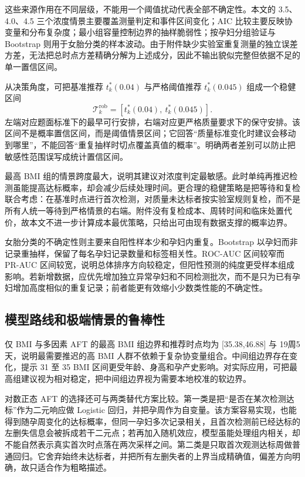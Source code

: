 \documentclass[UTF8,a4paper,12pt]{ctexart}
\begin{document}
这些来源作用在不同层级，不能用一个阈值扰动代表全部不确定性。本文的 3.5、4.0、4.5 三个浓度情景主要覆盖测量判定和事件区间变化；AIC 比较主要反映协变量和分布复杂度；最小组容量控制边界的抽样脆弱性；按孕妇分组验证与 Bootstrap 则用于女胎分类的样本波动。由于附件缺少实验室重复测量的独立误差方差，无法把总时点方差精确分解为上述成分，因此不输出貌似完整但依据不足的单一置信区间。

从决策角度，可把基准推荐 $t_k^*(0.04)$ 与严格阈值推荐 $t_k^*(0.045)$ 组成一个稳健区间
\begin{equation}
\mathcal T_k^{\mathrm{rob}}=
\left[t_k^*(0.04),\ t_k^*(0.045)\right].
\label{eq:robustwindow}
\end{equation}
左端对应题面标准下的最早可行安排，右端对应更严格质量要求下的保守安排。该区间不是概率置信区间，而是阈值情景区间；它回答“质量标准变化时建议会移动到哪里”，不能回答“重复抽样时切点覆盖真值的概率”。明确两者差别可以防止把敏感性范围误写成统计置信区间。

最高 BMI 组的情景跨度最大，说明其建议对浓度判定最敏感。此时单纯再推迟检测虽能提高达标概率，却会减少后续处理时间。更合理的稳健策略是把等待和复检联合考虑：在基准时点进行首次检测，对质量未达标者按实验室规则复检，而不是所有人统一等待到严格情景的右端。附件没有复检成本、周转时间和临床处置代价，故本文不进一步计算成本最优策略，只给出可由现有数据支撑的概率边界。

女胎分类的不确定性则主要来自阳性样本少和孕妇内重复。Bootstrap 以孕妇而非记录重抽样，保留了每名孕妇记录数量和标签相关性。ROC-AUC 区间较窄而 PR-AUC 区间较宽，说明总体排序方向较稳定，但阳性预测的纯度更受样本组成影响。若新增数据，应优先增加独立异常孕妇和不同检测批次，而不是只为已有孕妇增加高度相似的重复记录；前者能更有效缩小少数类性能的不确定性。

\subsection{模型路线和极端情景的鲁棒性}

仅 BMI 与多因素 AFT 的最高 BMI 组边界和推荐时点均为 [35.38,46.88] 与 19周5天，说明最需要推迟的高 BMI 人群不依赖于复杂协变量组合。中间组边界存在变化，提示 31 至 35 BMI 区间更受年龄、身高和孕产史影响。对实际应用，可把最高组建议视为相对稳定，把中间组边界视为需要本地校准的软边界。

对数正态 AFT 的选择还可与两类替代方案比较。第一类是把“是否在某次检测达标”作为二元响应做 Logistic 回归，并把孕周作为自变量。该方案容易实现，也能得到随孕周变化的达标概率，但同一孕妇多次记录相关，且首次检测前已经达标的左删失信息会被拆成若干二元点；若再加入随机效应，模型虽能处理组内相关，却不能自然表示真实首次时点落在两次采样之间。第二类是只取首次观测达标周做普通回归。它舍弃始终未达标者，并把所有左删失者的上界当成精确值，偏差方向明确，故只适合作为粗略描述。
\end{document}
